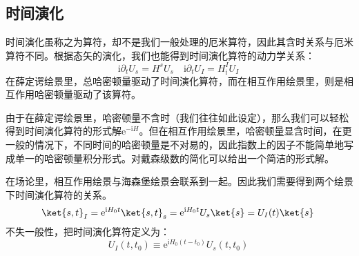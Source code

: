 \subsection{时间演化}
时间演化虽称之为算符，却不是我们一般处理的厄米算符，因此其含时关系与厄米算符不同。根据态矢的演化，我们也能得到时间演化算符的动力学关系：
\begin{equation}
\mathrm{i}\partial_tU_s=H^s U_s\quad \mathrm{i}\partial_tU_I=H^I_\mathrm{i} U_I~
\end{equation}
在薛定谔绘景里，总哈密顿量驱动了时间演化算符，而在相互作用绘景里，则是相互作用哈密顿量驱动了该算符。

由于在薛定谔绘景里，哈密顿量不含时（我们往往如此设定），那么我们可以轻松得到时间演化算符的形式解$\mathrm{e}^{-\mathrm{i}H}$。但在相互作用绘景里，哈密顿量显含时间，在更一般的情况下，不同时间的哈密顿量是不对易的，因此指数上的因子不能简单地写成单一的哈密顿量积分形式。对戴森级数的简化可以给出一个简洁的形式解。

在场论里，相互作用绘景与海森堡绘景会联系到一起。因此我们需要得到两个绘景下时间演化算符的关系。
\begin{equation}
\ket{s,t}_I=\mathrm{e} ^{\mathrm{i}H_0t}\ket{s,t}_s=\mathrm{e} ^{\mathrm{i}H_0t}U_s\ket{s}=U_I(t)\ket{s}~
\end{equation}
不失一般性，把时间演化算符定义为：
\begin{equation}
U_I(t,t_0)\equiv\mathrm{e} ^{\mathrm{i}H_0(t-t_0)}U_s(t,t_0)~
\end{equation}
